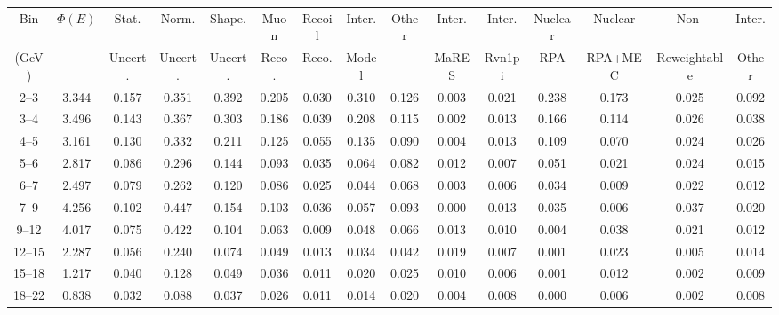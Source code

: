 \begin{turnpage}
\begin{table}[hpt]
   \setlength{\tabcolsep}{4pt}
    \begin{tabular}{ccccc|cccc|cccccc}
    \hline
 Bin & $\Phi(E)$ & 	 Stat.  & 	 Norm. & 	 Shape. & 	 Muon  & 	 Recoil  & 	 Inter.  & 	 Other & Inter. &  	 Inter. &  	 Nuclear &  	 Nuclear &  	 Non- &  	 Inter. \\
 (GeV) 	    &                  & 	Uncert.  & 	 Uncert. & 	 Uncert. 	& 	  Reco. & 	 Reco.  & 	  Model & 	 & MaRES &  Rvn1pi &  	 RPA &  	 RPA+MEC &  	 Reweightable & Other \\
    \hline
  2--3 &  	 3.344 &  	 0.157 &  	 0.351 &  	 0.392 &  	 0.205 &  	 0.030 &  	 0.310 &  	 0.126 &  	 0.003 &  	 0.021 &  	 0.238 &  	 0.173 &  	 0.025 &  	 0.092 \\ 
  3--4 &  	 3.496 &  	 0.143 &  	 0.367 &  	 0.303 &  	 0.186 &  	 0.039 &  	 0.208 &  	 0.115 &  	 0.002 &  	 0.013 &  	 0.166 &  	 0.114 &  	 0.026 &  	 0.038 \\ 
  4--5 &  	 3.161 &  	 0.130 &  	 0.332 &  	 0.211 &  	 0.125 &  	 0.055 &  	 0.135 &  	 0.090 &  	 0.004 &  	 0.013 &  	 0.109 &  	 0.070 &  	 0.024 &  	 0.026 \\ 
  5--6 &  	 2.817 &  	 0.086 &  	 0.296 &  	 0.144 &  	 0.093 &  	 0.035 &  	 0.064 &  	 0.082 &  	 0.012 &  	 0.007 &  	 0.051 &  	 0.021 &  	 0.024 &  	 0.015 \\ 
  6--7 &  	 2.497 &  	 0.079 &  	 0.262 &  	 0.120 &  	 0.086 &  	 0.025 &  	 0.044 &  	 0.068 &  	 0.003 &  	 0.006 &  	 0.034 &  	 0.009 &  	 0.022 &  	 0.012 \\ 
  7--9 &  	 4.256 &  	 0.102 &  	 0.447 &  	 0.154 &  	 0.103 &  	 0.036 &  	 0.057 &  	 0.093 &  	 0.000 &  	 0.013 &  	 0.035 &  	 0.006 &  	 0.037 &  	 0.020 \\ 
  9--12 &  	 4.017 &  	 0.075 &  	 0.422 &  	 0.104 &  	 0.063 &  	 0.009 &  	 0.048 &  	 0.066 &  	 0.013 &  	 0.010 &  	 0.004 &  	 0.038 &  	 0.021 &  	 0.012 \\ 
  12--15 &  	 2.287 &  	 0.056 &  	 0.240 &  	 0.074 &  	 0.049 &  	 0.013 &  	 0.034 &  	 0.042 &  	 0.019 &  	 0.007 &  	 0.001 &  	 0.023 &  	 0.005 &  	 0.014 \\ 
  15--18 &  	 1.217 &  	 0.040 &  	 0.128 &  	 0.049 &  	 0.036 &  	 0.011 &  	 0.020 &  	 0.025 &  	 0.010 &  	 0.006 &  	 0.001 &  	 0.012 &  	 0.002 &  	 0.009 \\ 
  18--22 &  	 0.838 &  	 0.032 &  	 0.088 &  	 0.037 &  	 0.026 &  	 0.011 &  	 0.014 &  	 0.020 &  	 0.004 &  	 0.008 &  	 0.000 &  	 0.006 &  	 0.002 &  	 0.008 \\ 

\end{tabular}
\end{table}
\end{turnpage}
